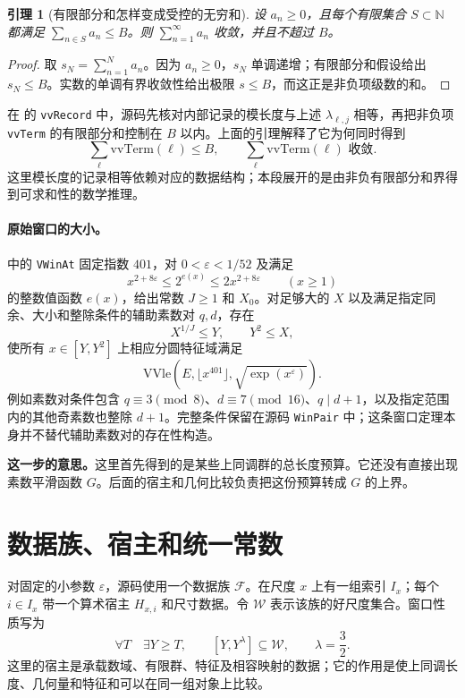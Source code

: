 \documentclass[UTF8,fontset=fandol,a4paper,openany,oneside]{ctexbook}
\newtheorem{lemma}[theorem]{引理}
\theoremstyle{definition}
\theoremstyle{remark}
\newcommand{\Expl}[1]{\par\smallskip\noindent\textbf{这一步的意思。}#1\par\smallskip}
\begin{document}
\begin{lemma}[有限部分和怎样变成受控的无穷和]
设 $a_n\ge0$，且每个有限集合 $S\subset\mathbb N$ 都满足 $\sum_{n\in S}a_n\le B$。则 $\sum_{n=1}^{\infty}a_n$ 收敛，并且不超过 $B$。
\end{lemma}
\begin{proof}
取 $s_N=\sum_{n=1}^N a_n$。因为 $a_n\ge0$，$s_N$ 单调递增；有限部分和假设给出 $s_N\le B$。实数的单调有界收敛性给出极限 $s\le B$，而这正是非负项级数的和。
\end{proof}

在  的 \texttt{vvRecord} 中，源码先核对内部记录的模长度与上述 $\lambda_{\ell,j}$ 相等，再把非负项 \texttt{vvTerm} 的有限部分和控制在 $B$ 以内。上面的引理解释了它为何同时得到
\[
\sum_{\ell}\mathrm{vvTerm}(\ell)\le B,
\qquad \sum_{\ell}\mathrm{vvTerm}(\ell)\text{ 收敛}.
\]
这里模长度的记录相等依赖对应的数据结构；本段展开的是由非负有限部分和界得到可求和性的数学推理。

\paragraph{原始窗口的大小。}
 中的 \texttt{VWinAt} 固定指数 $401$，对
$0<\varepsilon<1/52$ 及满足
\[
x^{2+8\varepsilon}\le2^{e(x)}\le2x^{2+8\varepsilon}\qquad(x\ge1)
\]
的整数值函数 $e(x)$，给出常数 $J\ge1$ 和 $X_0$。对足够大的 $X$ 以及满足指定同余、大小和整除条件的辅助素数对 $q,d$，存在
\[
X^{1/J}\le Y,\qquad Y^2\le X,
\]
使所有 $x\in[Y,Y^2]$ 上相应分圆特征域满足
\begin{equation}
\mathrm{VVle}\left(E,\lfloor x^{401}\rfloor,
\sqrt{\exp(x^\varepsilon)}\right).
\label{eq:arith-vwin}
\end{equation}
例如素数对条件包含 $q\equiv3\pmod8$、$d\equiv7\pmod{16}$、$q\mid d+1$，以及指定范围内的其他奇素数也整除 $d+1$。完整条件保留在源码 \texttt{WinPair} 中；这条窗口定理本身并不替代辅助素数对的存在性构造。

\Expl{这里首先得到的是某些上同调群的总长度预算。它还没有直接出现素数平滑函数 $G$。后面的宿主和几何比较负责把这份预算转成 $G$ 的上界。}

\section{数据族、宿主和统一常数}
\label{sec:arith-family}
对固定的小参数 $\varepsilon$，源码使用一个数据族 $\mathcal F$。在尺度 $x$ 上有一组索引 $I_x$；每个 $i\in I_x$ 带一个算术宿主 $H_{x,i}$ 和尺寸数据。令 $\mathcal W$ 表示该族的好尺度集合。窗口性质写为
\begin{equation}
\forall T\quad\exists Y\ge T,
\qquad [Y,Y^\lambda]\subseteq\mathcal W,
\qquad\lambda=\frac32.
\label{eq:arith-family-windows}
\end{equation}
这里的宿主是承载数域、有限群、特征及相容映射的数据；它的作用是使上同调长度、几何量和特征和可以在同一组对象上比较。
\end{document}

